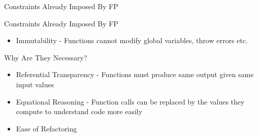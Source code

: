 \begin{section}{Constraints Already Imposed By FP}

\begin{frame}{Constraints Already Imposed By FP}
  \begin{itemize}
  \item Immutability - Functions cannot modify global variables, throw errors etc.
  \end{itemize}
\end{frame}

\begin{frame}{Why Are They Necessary?}
  \begin{itemize}
  \item Referential Transparency - Functions must produce same output given same input values
  \item Equational Reasoning - Function calls can be replaced by the values they compute to understand code more easily
  \item Ease of Refactoring
  \end{itemize}
\end{frame}

\end{section}
